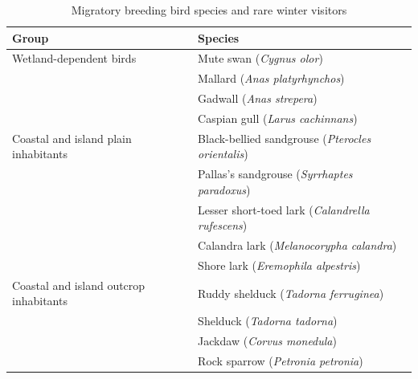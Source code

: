 \begin{table}[h]
\centering
\caption{Migratory breeding bird species and rare winter visitors}
\begin{tabular}{ll}
\hline
\textbf{Group} & \textbf{Species} \\
\hline
Wetland-dependent birds & Mute swan (\textit{Cygnus olor}) \\
& Mallard (\textit{Anas platyrhynchos}) \\
& Gadwall (\textit{Anas strepera}) \\
& Caspian gull (\textit{Larus cachinnans}) \\
\hline
Coastal and island plain inhabitants & Black-bellied sandgrouse (\textit{Pterocles orientalis}) \\
& Pallas’s sandgrouse (\textit{Syrrhaptes paradoxus}) \\
& Lesser short-toed lark (\textit{Calandrella rufescens}) \\
& Calandra lark (\textit{Melanocorypha calandra}) \\
& Shore lark (\textit{Eremophila alpestris}) \\
\hline
Coastal and island outcrop inhabitants & Ruddy shelduck (\textit{Tadorna ferruginea}) \\
& Shelduck (\textit{Tadorna tadorna}) \\
& Jackdaw (\textit{Corvus monedula}) \\
& Rock sparrow (\textit{Petronia petronia}) \\
\hline
\end{tabular}
\end{table}

